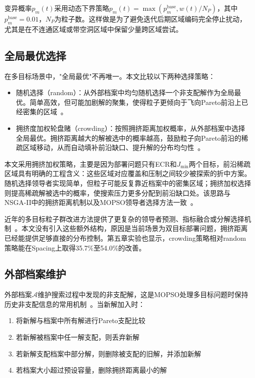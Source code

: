 变异概率$p_m(t)$采用动态下界策略$p_m(t)=\max(p_m^{\text{base}}, w(t)/N_P)$，其中$p_m^{\text{base}}=0.01$，$N_P$为粒子数。这样做是为了避免迭代后期区域编码完全停止扰动，尤其是在不连通区域或带空洞区域中保留少量跨区域尝试。

\subsection{全局最优选择}

在多目标场景中，"全局最优"不再唯一。本文比较以下两种选择策略：

\begin{itemize}
    \item 随机选择（random）：从外部档案中均匀随机选择一个非支配解作为全局最优。简单高效，但可能加剧解的聚集，使得粒子更倾向于飞向Pareto前沿上已经密集的区域~\cite{Coello2004}。
    \item 拥挤度加权轮盘赌（crowding）：按照拥挤距离加权概率，从外部档案中选择全局最优。拥挤距离越大的解被选中的概率越高，鼓励粒子向Pareto前沿的稀疏区域移动，从而自动填补前沿缺口、提升解的分布均匀性~\cite{Raquel2005}。
\end{itemize}

本文采用拥挤加权策略，主要是因为部署问题只有ECR和$J_{\min}$两个目标，前沿稀疏区域具有明确的工程含义：这些区域对应覆盖和压制之间较少被探索的折中方案。随机选择领导者实现简单，但粒子可能反复靠近档案中的密集区域；拥挤加权选择则提高稀疏解被选中的概率，使搜索压力更多分配到前沿缺口处。该思路与NSGA-II中的拥挤距离机制以及MOPSO领导者选择方法一致~\cite{Deb2002,Raquel2005}。

近年的多目标粒子群改进方法提供了更复杂的领导者预测、指标融合或分解选择机制~\cite{Liu2023,Wang2024,Zhang2024,Xu2024,Sun2024,Ma2025}。本文没有引入这些额外结构，原因是当前场景为双目标部署问题，拥挤距离已经能提供足够直接的分布控制。第五章实验也显示，crowding策略相对random策略能在Spacing上取得35.7\%至54.0\%的改善。

\subsection{外部档案维护}

外部档案$\mathcal{A}$维护搜索过程中发现的非支配解，这是MOPSO处理多目标问题时保持历史非支配信息的常用机制~\cite{Coello2004,Mostaghim2003}。当新解加入时：
\begin{enumerate}
    \item 将新解与档案中所有解进行Pareto支配比较
    \item 若新解被档案中任一解支配，则丢弃新解
    \item 若新解支配档案中部分解，则删除被支配的旧解，并添加新解
    \item 若档案大小超过预设容量，删除拥挤距离最小的解
\end{enumerate}

